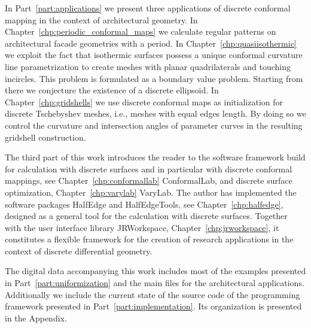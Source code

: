 \documentclass[Thesis.tex]{subfiles}
\begin{document}
In Part~\ref{part:applications} we present three applications of discrete conformal mapping in the context of architectural geometry. In Chapter~\ref{chp:periodic_conformal_maps} we calculate regular patterns on architectural facade geometries with a period. In Chapter~\ref{chp:quasiisothermic} we exploit the fact that isothermic surfaces possess a unique conformal curvature line parametrization to create meshes with planar quadrilaterals and touching incircles. This problem is formulated as a boundary value problem. Starting from there we conjecture the existence of a discrete ellipsoid. In Chapter~\ref{chp:gridshells} we use discrete conformal maps as initialization for discrete Tschebyshev meshes, i.e., meshes with equal edges length. By doing so we control the curvature and intersection angles of parameter curves in the resulting gridshell construction.

The third part of this work introduces the reader to the software framework build for calculation with discrete surfaces and in particular with discrete conformal mappings, see Chapter~\ref{chp:conformallab} {\sc ConformalLab}, and discrete surface optimization, Chapter~\ref{chp:varylab} {\sc VaryLab}. The author has implemented the software packages {\sc HalfEdge} and {\sc HalfEdgeTools}, see Chapter~\ref{chp:halfedge}, designed as a general tool for the calculation with discrete surfaces. Together with the user interface library {\sc JRWorkspace}, Chapter~\ref{chp:jrworkspace}, it constitutes a flexible framework for the creation of research applications in the context of discrete differential geometry. 

The digital data accompanying this work includes most of the examples presented in Part~\ref{part:uniformization} and the main files for the architectural applications. Additionally we include the current state of the source code of the programming framework presented in Part~\ref{part:implementation}. Its organization is presented in the Appendix.

\subfilebibliography
\end{document}

